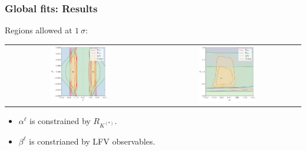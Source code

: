 \documentclass[mathserif, 10pt]{beamer}
\begin{document}
\begin{frame}
    \frametitle{Global fits: Results}
    Regions allowed at $1~\sigma$:
    \begin{center}
        \begin{tabular}{cc}
            \includegraphics[width=0.4\textwidth]{figures/alphabeta_l.pdf} & \includegraphics[width=0.4\textwidth]{figures/alphabeta_q.pdf}
        \end{tabular}
    \end{center}
    \begin{itemize}
        \item $\alpha^\ell$ is constrained by $R_{K^{(*)}}$.
        \item $\beta^\ell$ is constrianed by LFV observables.
    \end{itemize}
\end{frame}
\end{document}
